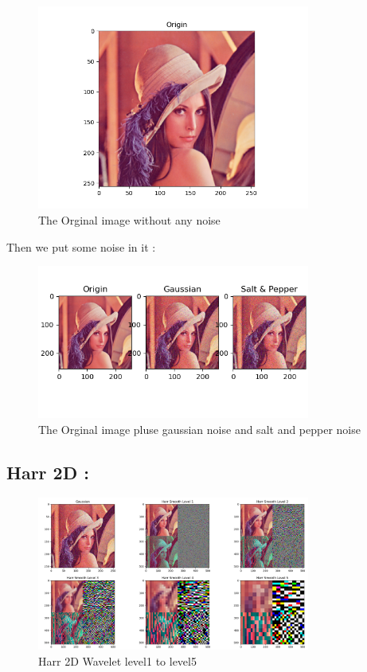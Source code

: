 \documentclass[12pt]{article}
\begin{document}
\begin{figure}[h]
    \centering
    \includegraphics[width=0.8\textwidth]{img/lena.png}
    \caption{The Orginal image without any noise}
    \label{fig:mesh1}
\end{figure}
\newpage
Then we put some noise in it : 

\begin{figure}[h]
    \centering
    \includegraphics[width=0.8\textwidth]{img/LenaNoise.png}
    \caption{The Orginal image pluse gaussian noise and salt and pepper noise}
    \label{fig:mesh1}
\end{figure}

\subsection{Harr 2D :}
\begin{figure}[h]
    \centering
    \includegraphics[width=0.8\textwidth]{img/Lena_Harr.png}
    \caption{Harr 2D Wavelet level1 to level5}
    \label{fig:mesh1}
\end{figure}
\newpage
\end{document}
